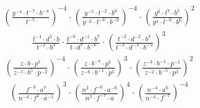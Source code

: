 \begin{align}
\left(\frac{y^{-4}\cdot t^{-7}\cdot b^{-4}}{t^{-5}}\right)^{-4}\cdot \left(\frac{y^{-5}\cdot t^{-2}\cdot b^{6}}{y^{-6}\cdot t^{-6}\cdot b^{-6}}\right)^{-4}\cdot \left(\frac{y^{6}\cdot t^{7}\cdot b^{5}}{y^{4}\cdot t^{-6}\cdot b^{6}}\right)^{2}
\end{align}
\begin{align}
\frac{t^{-1}\cdot d^{5}\cdot b}{t^{-2}\cdot b^{3}}\cdot \frac{t^{-6}\cdot d^{-1}\cdot b^{7}}{t\cdot d^{7}\cdot b^{-6}}\cdot \left(\frac{t^{-2}\cdot d^{-2}\cdot b^{3}}{t^{-3}\cdot d^{-3}\cdot b^{-5}}\right)^{3}
\end{align}
\begin{align}
\left(\frac{z\cdot b\cdot p^{7}}{z^{-5}\cdot b^{5}\cdot p^{-2}}\right)^{-4}\cdot \left(\frac{z\cdot b^{-7}\cdot p^{7}}{z^{-6}\cdot b^{-1}\cdot p^{5}}\right)^{3}\cdot \left(\frac{z^{-3}\cdot b^{-1}\cdot p^{-1}}{z^{-2}\cdot b^{-5}\cdot p^{3}}\right)^{2}
\end{align}
\begin{align}
\left(\frac{f^{-3}\cdot a^{7}}{n^{-4}\cdot f^{2}\cdot a^{-1}}\right)^{3}\cdot \left(\frac{n^{2}\cdot f^{-6}\cdot a^{-6}}{n^{3}\cdot f^{-7}\cdot a}\right)^{4}\cdot \left(\frac{n^{-4}\cdot a^{6}}{n^{-4}\cdot f^{-7}}\right)^{-4}
\end{align}
